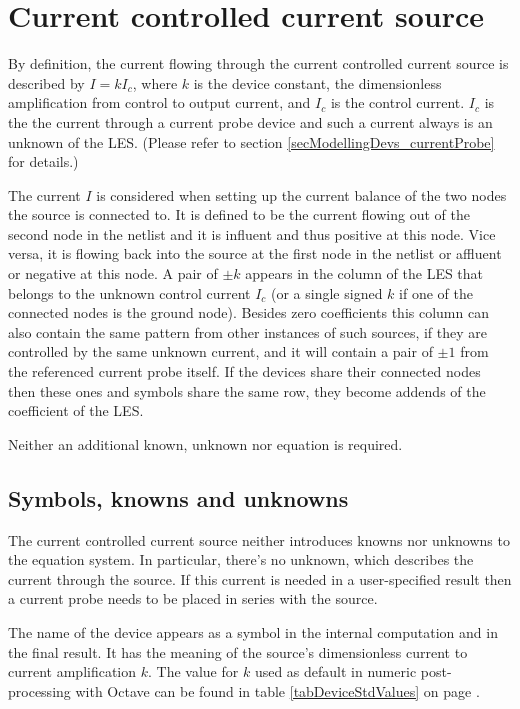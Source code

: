 \section{Current controlled current source}

By definition, the current flowing through the current controlled current
source is described by $I = kI_c$, where $k$ is the device constant, the
dimensionless amplification from control to output current, and $I_c$ is
the control current. $I_c$ is the the current through a current probe
device and such a current always is an unknown of the LES. (Please refer
to section \ref{secModellingDevs_currentProbe} for details.)

The current $I$ is considered when setting up the current balance of the
two nodes the source is connected to. It is defined to be the current
flowing out of the second node in the netlist and it is influent and thus
positive at this node. Vice versa, it is flowing back into the source at
the first node in the netlist or affluent or negative at this node. A pair
of $\pm k$ appears in the column of the LES that belongs to the unknown
control current $I_c$ (or a single signed $k$ if one of the connected
nodes is the ground node). Besides zero coefficients this column can also
contain the same pattern from other instances of such sources, if they are
controlled by the same unknown current, and it will contain a pair of $\pm
1$ from the referenced current probe itself. If the devices share their
connected nodes then these ones and symbols share the same row, they
become addends of the coefficient of the LES.

Neither an additional known, unknown nor equation is required.


\subsection{Symbols, knowns and unknowns}

The current controlled current source neither introduces knowns nor
unknowns to the equation system. In particular, there's no unknown, which
describes the current through the source. If this current is needed in a
user-specified result then a current probe needs to be placed in series
with the source.

The name of the device appears as a symbol in the internal computation and
in the final result. It has the meaning of the source's dimensionless
current to current amplification $k$. The value for $k$ used as default in
numeric post-processing with Octave can be found in table
\ref{tabDeviceStdValues} on page \pageref{tabDeviceStdValues}.


